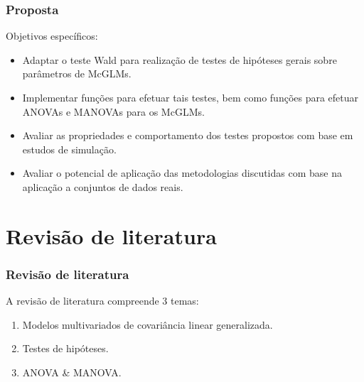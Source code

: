 \documentclass[10pt,
  aspectratio=169,
  serif,
  mathserif,
  professionalfont,
  compress,
  handout,
  ]{beamer}\usepackage[]{graphicx}\usepackage[]{color}
\begin{document}

\begin{frame}
  \frametitle{Proposta}

Objetivos específicos: 

  \begin{itemize}
    \itemsep 2ex

  \item Adaptar o teste Wald para realização de testes de hipóteses gerais sobre parâmetros de McGLMs. 
  
  \item Implementar funções para efetuar tais testes, bem como funções para efetuar ANOVAs e MANOVAs para os McGLMs. 

  \item Avaliar as propriedades e comportamento dos testes propostos com base em estudos de simulação.

  \item Avaliar o potencial de aplicação das metodologias discutidas com base na aplicação a conjuntos de dados reais.

  \end{itemize}

\end{frame}


\section{Revisão de literatura}


\begin{frame}
  \frametitle{Revisão de literatura}
  
  A revisão de literatura compreende 3 temas:
  
  \begin{enumerate}
    \itemsep 2ex
  \item Modelos multivariados de covariância linear generalizada. 
  \item Testes de hipóteses.
  \item ANOVA \& MANOVA.
  \end{enumerate}
\end{frame}

\end{document}
